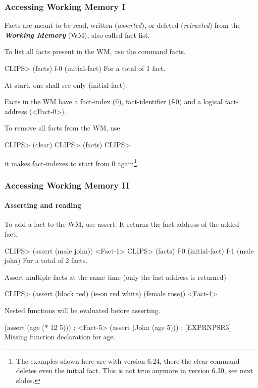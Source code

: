 \documentclass[xcolor={usenames,dvipsnames,svgnames}, compress]{beamer}
\begin{document}
\begin{frame}[fragile]
  \frametitle{Accessing Working Memory I}
   Facts are meant to be read, written (\emph{asserted}), or deleted
  (\emph{retracted}) from the \textbf{\emph{Working Memory}}
  (WM), also called \textsf{fact-list}.\par\bigskip
  
  To list all facts present in the WM, use the command \textsf{facts}.
  \begin{clips-code}
    CLIPS> (facts)
    f-0     (initial-fact)
    For a total of 1 fact.
     \end{clips-code}
  At start, one shall see only \textsf{(initial-fact)}.\par
  
  Facts in the WM have a \textsf{fact-index} (0),
  \textsf{fact-identifier} (f-0) and a logical \textsf{fact-address} (<Fact-0>).
  
  To remove all facts from the WM, use
  \begin{clips-code}[firstnumber=4]
    CLIPS> (clear)
    CLIPS> (facts)
    CLIPS>
  \end{clips-code}
  it makes \textsf{fact-index}es to start from 0 again\footnote{The
    examples shown here are with version 6.24, there the clear command
  deletes even the initial fact. This is not true anymore in version
  6.30, see next slides.}.\par
  
\end{frame}

\begin{frame}[fragile]
  \frametitle{Accessing Working Memory II}
  \framesubtitle{Asserting and reading}
  To add a fact to the WM, use \textsf{assert}. It returns the
  \textsf{fact-address} of the added fact.
  \begin{clips-code}
    CLIPS> (assert (male john))
    <Fact-1>
    CLIPS> (facts)
    f-0     (initial-fact)
    f-1     (male john)
    For a total of 2 facts.
  \end{clips-code}
  Assert multiple facts at the same time (only the last address is returned)
  \begin{clips-code}[firstnumber=7]
    CLIPS> (assert (block red) (is-on red white) (female rose))
    <Fact-4>
  \end{clips-code}

  Nested functions will be evaluated before asserting.
  \begin{clips-code}[numbers=none]
    (assert (age (* 12 5))) ; <Fact-5>
    (assert (John (age 5))) ; [EXPRNPSR3] Missing function declaration for age.
  \end{clips-code}
\end{frame}
\end{document}
